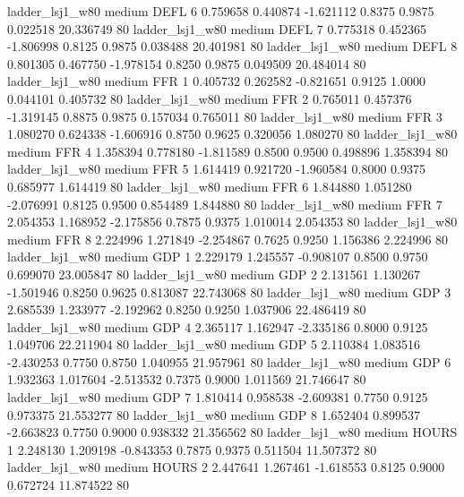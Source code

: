        ladder_lsj1_w80     medium     DEFL                 6  0.759658 0.440874 -1.621112 0.8375 0.9875  0.022518   20.336749 80
       ladder_lsj1_w80     medium     DEFL                 7  0.775318 0.452365 -1.806998 0.8125 0.9875  0.038488   20.401981 80
       ladder_lsj1_w80     medium     DEFL                 8  0.801305 0.467750 -1.978154 0.8250 0.9875  0.049509   20.484014 80
       ladder_lsj1_w80     medium      FFR                 1  0.405732 0.262582 -0.821651 0.9125 1.0000  0.044101    0.405732 80
       ladder_lsj1_w80     medium      FFR                 2  0.765011 0.457376 -1.319145 0.8875 0.9875  0.157034    0.765011 80
       ladder_lsj1_w80     medium      FFR                 3  1.080270 0.624338 -1.606916 0.8750 0.9625  0.320056    1.080270 80
       ladder_lsj1_w80     medium      FFR                 4  1.358394 0.778180 -1.811589 0.8500 0.9500  0.498896    1.358394 80
       ladder_lsj1_w80     medium      FFR                 5  1.614419 0.921720 -1.960584 0.8000 0.9375  0.685977    1.614419 80
       ladder_lsj1_w80     medium      FFR                 6  1.844880 1.051280 -2.076991 0.8125 0.9500  0.854489    1.844880 80
       ladder_lsj1_w80     medium      FFR                 7  2.054353 1.168952 -2.175856 0.7875 0.9375  1.010014    2.054353 80
       ladder_lsj1_w80     medium      FFR                 8  2.224996 1.271849 -2.254867 0.7625 0.9250  1.156386    2.224996 80
       ladder_lsj1_w80     medium      GDP                 1  2.229179 1.245557 -0.908107 0.8500 0.9750  0.699070   23.005847 80
       ladder_lsj1_w80     medium      GDP                 2  2.131561 1.130267 -1.501946 0.8250 0.9625  0.813087   22.743068 80
       ladder_lsj1_w80     medium      GDP                 3  2.685539 1.233977 -2.192962 0.8250 0.9250  1.037906   22.486419 80
       ladder_lsj1_w80     medium      GDP                 4  2.365117 1.162947 -2.335186 0.8000 0.9125  1.049706   22.211904 80
       ladder_lsj1_w80     medium      GDP                 5  2.110384 1.083516 -2.430253 0.7750 0.8750  1.040955   21.957961 80
       ladder_lsj1_w80     medium      GDP                 6  1.932363 1.017604 -2.513532 0.7375 0.9000  1.011569   21.746647 80
       ladder_lsj1_w80     medium      GDP                 7  1.810414 0.958538 -2.609381 0.7750 0.9125  0.973375   21.553277 80
       ladder_lsj1_w80     medium      GDP                 8  1.652404 0.899537 -2.663823 0.7750 0.9000  0.938332   21.356562 80
       ladder_lsj1_w80     medium    HOURS                 1  2.248130 1.209198 -0.843353 0.7875 0.9375  0.511504   11.507372 80
       ladder_lsj1_w80     medium    HOURS                 2  2.447641 1.267461 -1.618553 0.8125 0.9000  0.672724   11.874522 80
